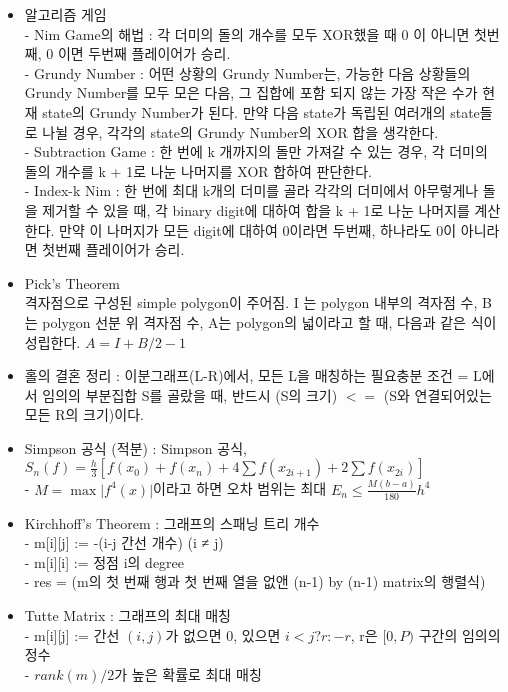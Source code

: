 \documentclass[landscape, 8pt, a4paper, oneside, twocolumn]{extarticle}
\begin{document}
\begin{itemize}
\item 알고리즘 게임\\
- Nim Game의 해법 : 각 더미의 돌의 개수를 모두 XOR했을 때 0 이 아니면 첫번째, 0 이면 두번째 플레이어가 승리.\\
- Grundy Number : 어떤 상황의 Grundy Number는, 가능한 다음 상황들의 Grundy Number를 모두 모은 다음, 그 집합에 포함 되지 않는 가장 작은 수가 현재 state의 Grundy Number가 된다. 만약 다음 state가 독립된 여러개의 state들로 나뉠 경우, 각각의 state의 Grundy Number의 XOR 합을 생각한다.\\
- Subtraction Game : 한 번에 k 개까지의 돌만 가져갈 수 있는 경우, 각 더미의 돌의 개수를 k + 1로 나눈 나머지를 XOR 합하여 판단한다.\\
- Index-k Nim : 한 번에 최대 k개의 더미를 골라 각각의 더미에서 아무렇게나 돌을 제거할 수 있을 때, 각 binary digit에 대하여 합을 k + 1로 나눈 나머지를 계산한다. 만약 이 나머지가 모든 digit에 대하여 0이라면 두번째, 하나라도 0이 아니라면 첫번째 플레이어가 승리.

\item Pick’s Theorem\\
격자점으로 구성된 simple polygon이 주어짐. I 는 polygon 내부의 격자점 수, B 는 polygon 선분 위 격자점 수, A는 polygon의 넓이라고 할 때, 다음과 같은 식이 성립한다. $A=I+B/2-1$

\item 홀의 결혼 정리 : 이분그래프(L-R)에서, 모든 L을 매칭하는 필요충분 조건 = L에서 임의의 부분집합 S를 골랐을 때, 반드시 (S의 크기) $<=$ (S와 연결되어있는 모든 R의 크기)이다.

\item Simpson 공식 (적분) : Simpson 공식, $S_n(f) = \frac{h}{3}[f(x_0)+f(x_n)+ 4\sum f(x_{2i+1}) + 2\sum f(x_{2i})]$\\
- $M = \max \vert f^4(x) \vert$이라고 하면 오차 범위는 최대 $E_n \leq \frac{M(b-a)}{180}h^4$

\item Kirchhoff’s Theorem : 그래프의 스패닝 트리 개수\\
- m[i][j] :=  -(i-j 간선 개수) (i ≠ j)\\
- m[i][i] :=  정점 i의 degree\\
- res =  (m의 첫 번째 행과 첫 번째 열을 없앤 (n-1) by (n-1) matrix의 행렬식)

\item Tutte Matrix : 그래프의 최대 매칭\\
- m[i][j] := 간선 $(i, j)$가 없으면 0, 있으면 $i < j ? r : -r$, r은 $[0,P)$ 구간의 임의의 정수\\
- $rank(m) / 2$가 높은 확률로 최대 매칭


\end{itemize}
\end{document}
